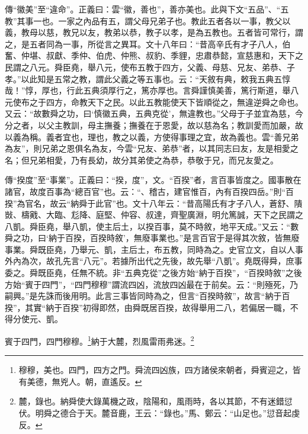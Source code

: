 {\noindent\zhuan{}\fzbyks 傳“徽美”至“違命”。正義曰：雲“徽，善也”，善亦美也。此與下文“五品”、“五教”其事一也。一家之內品有五，謂父母兄弟子也。教此五者各以一事，教父以義，教母以慈，教兄以友，教弟以恭，教子以孝，是為五教也。五者皆可常行，謂之，是五者同為一事，所從言之異耳。文十八年曰：“昔高辛氏有才子八人，伯奮、仲堪、叔獻、季仲、伯虎、仲熊、叔豹、季貍，忠肅恭懿，宣慈惠和，天下之民謂之八元。舜臣堯，舉八元，使布五教于四方，父義、母慈、兄友、弟恭、子孝。”以此知是五常之教，謂此父義之等五事也。云：“天敘有典，敕我五典五惇哉！”惇，厚也，行此五典須厚行之，篤亦厚也。言舜謹慎美善，篤行斯道，舉八元使布之于四方，命教天下之民。以此五教能使天下皆順從之，無違逆舜之命也。又云：“故數舜之功，曰‘慎徽五典，五典克從’，無違教也。”父母于子並宜為慈，今分之者，以父主教訓，母主撫養；撫養在于恩愛，故以慈為名；教訓愛而加嚴，故以義為稱。義者宜也，理也，教之以義，方使得事理之宜，故為義也。雲“善兄弟為友”，則兄弟之恩俱名為友，今雲“兄友、弟恭”者，以其同志曰友，友是相愛之名；但兄弟相愛，乃有長幼，故分其弟使之為恭，恭敬于兄，而兄友愛之。 \par}

{\noindent\zhuan{}\fzbyks 傳“揆度”至“事業”。正義曰：“揆，度”，文。“百揆”者，言百事皆度之。國事散在諸官，故度百事為“總百官”也。云：“、稽古，建官惟百，內有百揆四岳。”則“百揆”為官名，故云“納舜于此官”也。文十八年云：“昔高陽氏有才子八人，蒼舒、隤敱、檮戭、大臨、尨降、庭堅、仲容、叔達，齊聖廣淵，明允篤誠，天下之民謂之八凱。舜臣堯，舉八凱，使主后土，以揆百事，莫不時敘，地平天成。”又云：“數舜之功，曰‘納于百揆，百揆時敘’，無廢事業也。”是言百官于是得其次敘，皆無廢事業。舜既臣堯，乃舉元、凱，主后土，布五教，同時為之。史官立文，自以人事外內為次，故孔先言“八元”。若據所出代之先後，故先舉“八凱”。堯既得舜，庶事委之。舜既臣堯，任無不統。非“五典克從”之後方始“納于百揆”，“百揆時敘”之後方始“賓于四門”，“四門穆穆”謂流四凶，流放四凶最在于前矣。云：“則殛死，乃嗣興。”是先誅而後用明。此言三事皆同時為之，但言“百揆時敘”，故言“納于百揆”，其實“納于百揆”初得即然，由舜既居百揆，故得舉用二八，若偏居一職，不得分使元、凱。 \par}

賓于四門，四門穆穆。\footnote{穆穆，美也。四門，四方之門。舜流四凶族，四方諸侯來朝者，舜賓迎之，皆有美德，無兇人。朝，直遙反。}納于大麓，烈風雷雨弗迷。\footnote{麓，錄也。納舜使大錄萬機之政，陰陽和，風雨時，各以其節，不有迷錯愆伏。明舜之德合于天。麓音鹿，王云：“錄也。”馬、鄭云：“山足也。”愆音起虔反。}

